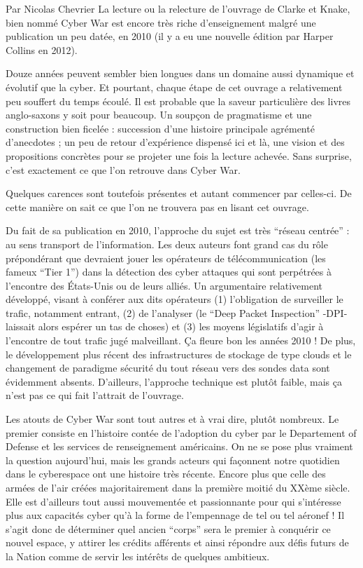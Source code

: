 
Par Nicolas Chevrier
La lecture ou la relecture de l’ouvrage de Clarke et Knake, bien nommé Cyber War est encore très riche d’enseignement malgré une publication un peu datée, en 2010 (il y a eu une nouvelle édition par Harper Collins en 2012).


Douze années peuvent sembler bien longues dans un domaine aussi dynamique et évolutif que la cyber. Et pourtant, chaque étape de cet ouvrage a relativement peu souffert du temps écoulé. Il est probable que la saveur particulière des livres anglo-saxons y soit pour beaucoup. Un soupçon de pragmatisme et une construction bien ficelée : succession d’une histoire principale agrémenté d’anecdotes ; un peu de retour d’expérience dispensé ici et là, une vision et des propositions concrètes pour se projeter une fois la lecture achevée. Sans surprise, c’est exactement ce que l’on retrouve dans Cyber War.

Quelques carences sont toutefois présentes et autant commencer par celles-ci. De cette manière on sait ce que l’on ne trouvera pas en lisant cet ouvrage.

Du fait de sa publication en 2010, l’approche du sujet est très “réseau centrée” : au sens transport de l’information. Les deux auteurs font grand cas du rôle prépondérant que devraient jouer les opérateurs de télécommunication (les fameux “Tier 1”) dans la détection des cyber attaques qui sont perpétrées à l’encontre des États-Unis ou de leurs alliés. Un argumentaire relativement développé, visant à conférer aux dits opérateurs (1) l’obligation de surveiller le trafic, notamment entrant, (2) de l’analyser (le “Deep Packet Inspection” -DPI- laissait alors espérer un tas de choses) et (3) les moyens législatifs d’agir à l’encontre de tout trafic jugé malveillant. Ça fleure bon les années 2010 ! De plus, le développement plus récent des infrastructures de stockage de type clouds et le changement de paradigme sécurité du tout réseau vers des sondes data sont évidemment absents. D’ailleurs, l’approche technique est plutôt faible, mais ça n’est pas ce qui fait l’attrait de l’ouvrage. 

Les atouts de Cyber War sont tout autres et à vrai dire, plutôt nombreux. Le premier consiste en l’histoire contée de l’adoption du cyber par le Departement of Defense et les services de renseignement américains. On ne se pose plus vraiment la question aujourd’hui, mais les grands acteurs qui façonnent notre quotidien dans le cyberespace ont une histoire très récente. Encore plus que celle des armées de l’air créées majoritairement dans la première moitié du XXème siècle. Elle est d’ailleurs tout aussi mouvementée et passionnante pour qui s’intéresse plus aux capacités cyber qu’à la forme de l’empennage de tel ou tel aéronef ! Il s’agit donc de déterminer quel ancien “corps” sera le premier à conquérir ce nouvel espace, y attirer les crédits afférents et ainsi répondre aux défis futurs de la Nation comme de servir les intérêts de quelques ambitieux. 

